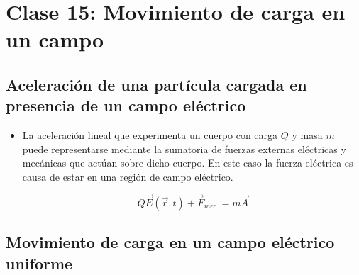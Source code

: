 \documentclass[a4paper,10pt]{article}
\begin{document}

\section*{Clase 15: Movimiento de carga en un campo}

\subsection*{Aceleraci\'on de una part\'icula cargada en presencia de un campo el\'ectrico}

\begin{itemize}

\item La aceleraci\'on lineal que experimenta un cuerpo con carga $Q$ y masa $m$ puede
representarse mediante la sumatoria de fuerzas externas el\'ectricas y mec\'anicas que act\'uan
sobre dicho cuerpo. En este caso la fuerza el\'ectrica es causa de estar en una regi\'on de
campo el\'ectrico.

\begin{equation*}
    \boxed{Q\vec{E}(\vec{r},t)+\vec{F}_{mec.}=m\vec{A}}
\end{equation*}

\end{itemize}

\subsection*{Movimiento de carga en un campo el\'ectrico uniforme}
\end{document}
